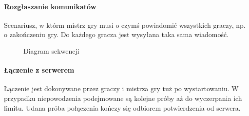 \documentclass[11pt]{article}
\begin{document}
\paragraph{Rozgłaszanie komunikatów}

Scenariusz, w którm mistrz gry musi o czymś powiadomić wszystkich graczy, np. o zakończeniu gry. Do każdego gracza jest wysyłana taka sama wiadomość.

\begin{figure}[!h]
	\centering
	\caption{Diagram sekwencji}
		\hspace*{-1.3cm}
\end{figure}
\FloatBarrier

\paragraph{Łączenie z serwerem}

Łączenie jest dokonywane przez graczy i mistrza gry tuż po wystartowaniu. W przypadku niepowodzenia podejmowane są kolejne próby aż do wyczerpania ich limitu. Udana próba połączenia kończy się odbiorem potwierdzenia od serwera.
\end{document}
